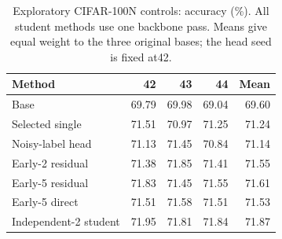 \begin{table}[ht]
\centering
\caption{Exploratory CIFAR-100N controls: accuracy (\%). All student methods use one backbone pass. Means give equal weight to the three original bases; the head seed is fixed at42.}
\begin{tabular}{lrrrr}
\toprule
Method &42&43&44&Mean\\
\midrule
Base & 69.79 & 69.98 & 69.04 & 69.60\\
Selected single & 71.51 & 70.97 & 71.25 & 71.24\\
Noisy-label head & 71.13 & 71.45 & 70.84 & 71.14\\
Early-2 residual & 71.38 & 71.85 & 71.41 & 71.55\\
Early-5 residual & 71.83 & 71.45 & 71.55 & 71.61\\
Early-5 direct & 71.51 & 71.58 & 71.51 & 71.53\\
Independent-2 student & 71.95 & 71.81 & 71.84 & 71.87\\
\bottomrule
\end{tabular}
\end{table}
